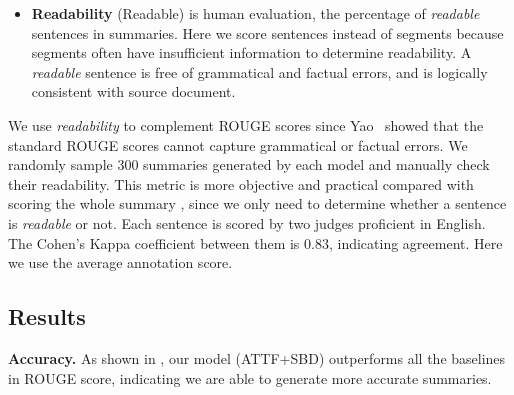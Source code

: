 \begin{itemize}
\item \textbf{Readability} (Readable) is human evaluation, 
the percentage of
\textit{readable} sentences in summaries.
Here we score sentences instead of segments because segments often have
insufficient information to determine readability.
A \textit{readable} sentence is free of grammatical and 
factual errors, 
and is logically consistent with source document.
\end{itemize}

We use \textit{readability} to complement ROUGE scores 
since Yao~ showed that the standard 
ROUGE scores cannot capture grammatical or factual errors. 
We randomly sample 300 summaries generated by each model
and manually check their readability. 
This metric is more objective and practical compared with
scoring the whole summary \cite{D18-1205}, since we only need 
to determine whether a sentence is {\em readable} or not.
Each sentence is scored by two judges proficient in English. 
The Cohen's Kappa coefficient between them is $0.83$, 
indicating agreement. Here we use the average annotation score.

\subsection{Results}
\label{sec:result}

\textbf{Accuracy.} As shown in , 
our model (ATTF+SBD) outperforms all the baselines in ROUGE score, 
indicating we are able to generate more
accurate summaries. 

